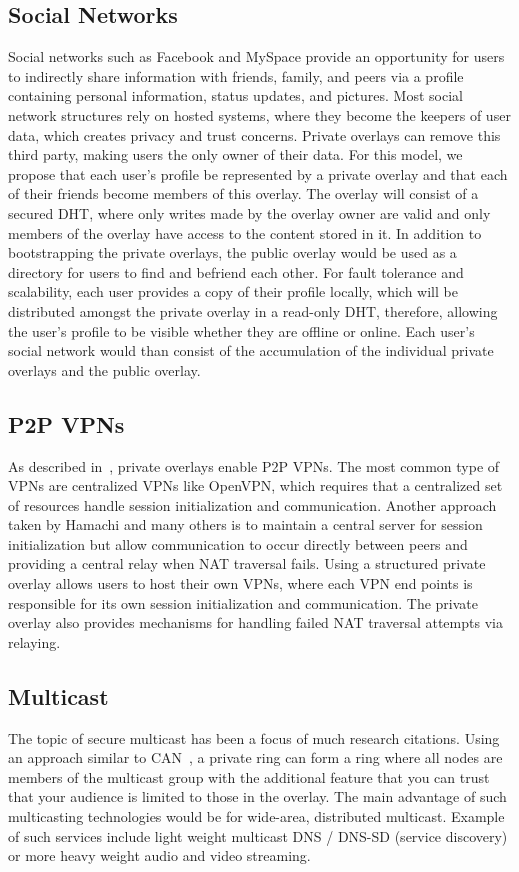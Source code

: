 \documentclass[conference]{IEEEtran}
\begin{document}
\subsection{Social Networks}
Social networks such as Facebook and MySpace provide an opportunity for users to
indirectly share information with friends, family, and peers via a profile
containing personal information, status updates, and pictures.
Most social network structures rely on hosted systems, where they become
the keepers of user data, which creates privacy and trust concerns.  Private overlays
can remove this third party, making users the only owner of their data.  For this
model, we propose that each user's profile be represented by a private overlay
and that each of their friends become members of this overlay.  The overlay will
consist of a secured DHT, where only writes made by the overlay owner are valid
and only members of the overlay have access to the content stored in it.  In
addition to bootstrapping the private overlays, the public overlay would be
used as a directory for users to find and befriend each other.  For fault
tolerance and scalability, each user provides a copy of their profile
locally, which will be distributed amongst the private overlay in a read-only
DHT, therefore, allowing the user's profile to be visible whether they are
offline or online.  Each user's social network would than consist of the
accumulation of the individual private overlays and the public overlay.

\subsection{P2P VPNs}
As described in~\cite{nsdi10}, private overlays enable P2P VPNs.  The most
common type of VPNs are centralized VPNs like OpenVPN, which requires that a
centralized set of resources handle session initialization and communication.
Another approach taken by Hamachi and many others is to maintain a central
server for session initialization but allow communication to occur directly
between peers and providing a central relay when NAT traversal fails.  Using
a structured private overlay allows users to host their own VPNs, where each
VPN end points is responsible for its own session initialization and
communication.  The private overlay also provides mechanisms for handling
failed NAT traversal attempts via relaying.

\subsection{Multicast}
The topic of secure multicast has been a focus of much research citations.
Using an approach similar to CAN~\cite{can_multicast}, a private ring can form
a ring where all nodes are members of the multicast group with the additional
feature that you can trust that your audience is limited to those in the
overlay.  The main advantage of such multicasting technologies would be for
wide-area, distributed multicast.  Example of such services include 
light weight multicast DNS / DNS-SD (service discovery) or more heavy weight
audio and video streaming.
\end{document}
